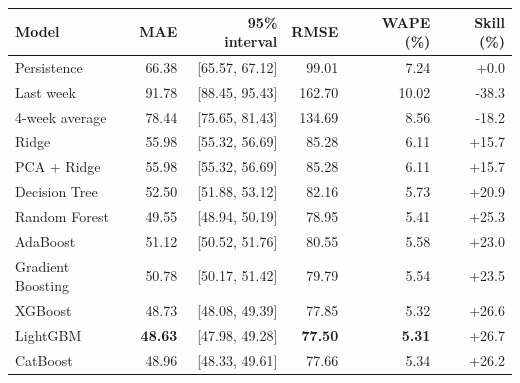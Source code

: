 \begin{tabular}{lrrrrr}
\toprule
Model & MAE & 95\% interval & RMSE & WAPE (\%) & Skill (\%) \\
\midrule
Persistence & 66.38 & {\small [65.57, 67.12]} & 99.01 & 7.24 & +0.0 \\
Last week & 91.78 & {\small [88.45, 95.43]} & 162.70 & 10.02 & -38.3 \\
4-week average & 78.44 & {\small [75.65, 81.43]} & 134.69 & 8.56 & -18.2 \\
\midrule
Ridge & 55.98 & {\small [55.32, 56.69]} & 85.28 & 6.11 & +15.7 \\
PCA + Ridge & 55.98 & {\small [55.32, 56.69]} & 85.28 & 6.11 & +15.7 \\
Decision Tree & 52.50 & {\small [51.88, 53.12]} & 82.16 & 5.73 & +20.9 \\
Random Forest & 49.55 & {\small [48.94, 50.19]} & 78.95 & 5.41 & +25.3 \\
AdaBoost & 51.12 & {\small [50.52, 51.76]} & 80.55 & 5.58 & +23.0 \\
Gradient Boosting & 50.78 & {\small [50.17, 51.42]} & 79.79 & 5.54 & +23.5 \\
XGBoost & 48.73 & {\small [48.08, 49.39]} & 77.85 & 5.32 & +26.6 \\
LightGBM & \textbf{48.63} & {\small [47.98, 49.28]} & \textbf{77.50} & \textbf{5.31} & +26.7 \\
CatBoost & 48.96 & {\small [48.33, 49.61]} & 77.66 & 5.34 & +26.2 \\
\bottomrule
\end{tabular}

